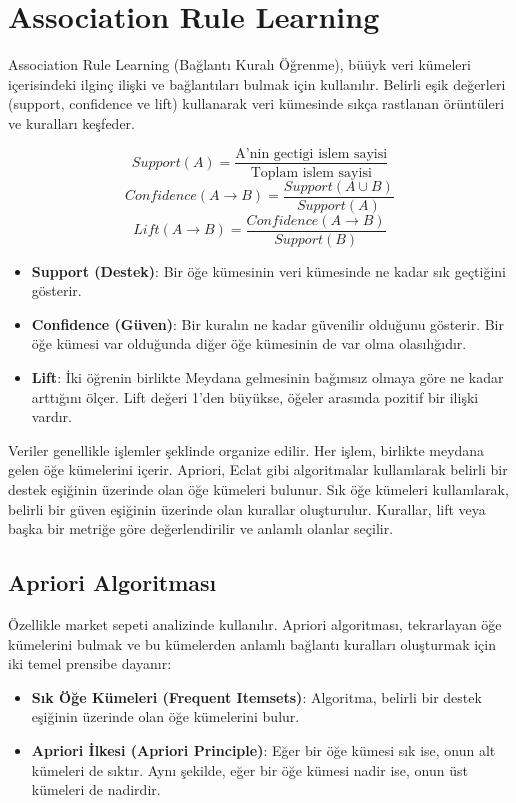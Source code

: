 \section{Association Rule Learning}

Association Rule Learning (Bağlantı Kuralı Öğrenme), büüyk veri kümeleri içerisindeki ilginç ilişki ve bağlantıları bulmak için kullanılır. Belirli eşik değerleri  (support, confidence ve lift) kullanarak veri kümesinde sıkça rastlanan örüntüleri ve kuralları keşfeder.

\[ Support(A) = \frac{\text{A'nin gectigi islem sayisi}}{\text{Toplam islem sayisi}} \]
\[ Confidence(A \rightarrow B) = \frac{Support(A \cup B)}{Support(A)} \]
\[ Lift(A \rightarrow B) = \frac{Confidence(A \rightarrow B)}{Support(B)} \]

\begin{itemize}
	\item \textbf{Support (Destek)}: Bir öğe kümesinin veri kümesinde ne kadar sık geçtiğini gösterir.
	\item \textbf{Confidence (Güven)}: Bir kuralın ne kadar güvenilir olduğunu gösterir. Bir öğe kümesi var olduğunda diğer öğe kümesinin de var olma olasılığıdır.
	\item \textbf{Lift}: İki öğrenin birlikte Meydana gelmesinin bağımsız olmaya göre ne kadar arttığını ölçer. Lift değeri 1'den büyükse, öğeler arasında pozitif bir ilişki vardır.
\end{itemize}

Veriler genellikle işlemler şeklinde organize edilir. Her işlem, birlikte meydana gelen öğe kümelerini içerir. Apriori, Eclat gibi algoritmalar kullanılarak belirli bir destek eşiğinin üzerinde olan öğe kümeleri bulunur. Sık öğe kümeleri kullanılarak, belirli bir güven eşiğinin üzerinde olan kurallar oluşturulur. Kurallar, lift veya başka bir metriğe göre değerlendirilir ve anlamlı olanlar seçilir.

\newpage

\subsection{Apriori Algoritması}
Özellikle market sepeti analizinde kullanılır. Apriori algoritması, tekrarlayan öğe kümelerini bulmak ve bu kümelerden anlamlı bağlantı kuralları oluşturmak için iki temel prensibe dayanır:

\begin{itemize}
	\item \textbf{Sık Öğe Kümeleri (Frequent Itemsets)}: Algoritma, belirli bir destek eşiğinin üzerinde olan öğe kümelerini bulur.
	\item \textbf{Apriori İlkesi (Apriori Principle)}: Eğer bir öğe kümesi sık ise, onun alt kümeleri de sıktır. Aynı şekilde, eğer bir öğe kümesi nadir ise, onun üst kümeleri de nadirdir.
\end{itemize}

